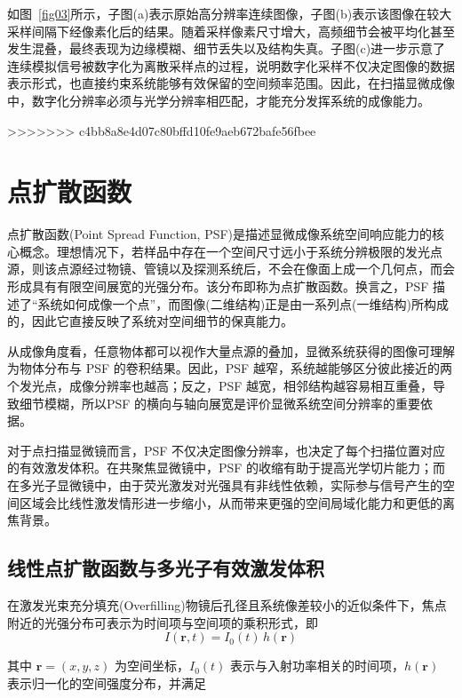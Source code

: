 如图~\ref{fig03}所示，子图(a)表示原始高分辨率连续图像，子图(b)表示该图像在较大采样间隔下经像素化后的结果。随着采样像素尺寸增大，高频细节会被平均化甚至发生混叠，最终表现为边缘模糊、细节丢失以及结构失真。子图(c)进一步示意了连续模拟信号被数字化为离散采样点的过程，说明数字化采样不仅决定图像的数据表示形式，也直接约束系统能够有效保留的空间频率范围。因此，在扫描显微成像中，数字化分辨率必须与光学分辨率相匹配，才能充分发挥系统的成像能力。

>>>>>>> c4bb8a8e4d07c80bffd10fe9aeb672bafe56fbee



\section{点扩散函数}\label{2.2}
点扩散函数(Point Spread Function, PSF)是描述显微成像系统空间响应能力的核心概念。理想情况下，若样品中存在一个空间尺寸远小于系统分辨极限的发光点源，则该点源经过物镜、管镜以及探测系统后，不会在像面上成一个几何点，而会形成具有有限空间展宽的光强分布。该分布即称为点扩散函数。换言之，PSF 描述了``系统如何成像一个点''，而图像(二维结构)正是由一系列点(一维结构)所构成的，因此它直接反映了系统对空间细节的保真能力。

从成像角度看，任意物体都可以视作大量点源的叠加，显微系统获得的图像可理解为物体分布与 PSF 的卷积结果。因此，PSF 越窄，系统越能够区分彼此接近的两个发光点，成像分辨率也越高；反之，PSF 越宽，相邻结构越容易相互重叠，导致细节模糊，所以PSF 的横向与轴向展宽是评价显微系统空间分辨率的重要依据。

对于点扫描显微镜而言，PSF 不仅决定图像分辨率，也决定了每个扫描位置对应的有效激发体积。在共聚焦显微镜中，PSF 的收缩有助于提高光学切片能力；而在多光子显微镜中，由于荧光激发对光强具有非线性依赖，实际参与信号产生的空间区域会比线性激发情形进一步缩小，从而带来更强的空间局域化能力和更低的离焦背景。




\subsection{线性点扩散函数与多光子有效激发体积}\label{2.2.1}
在激发光束充分填充(Overfilling)物镜后孔径且系统像差较小的近似条件下，焦点附近的光强分布可表示为时间项与空间项的乘积形式，即
\begin{equation}
  I(\mathbf{r},t)=I_{0}(t)\,h(\mathbf{r})
  \label{eq:psf_separation}
\end{equation}

其中 $\mathbf{r}=(x,y,z)$ 为空间坐标，$I_{0}(t)$ 表示与入射功率相关的时间项，$h(\mathbf{r})$ 表示归一化的空间强度分布，并满足

